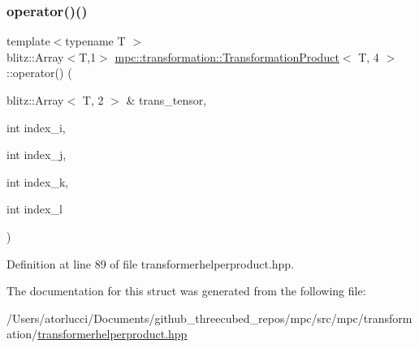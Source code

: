 \subsubsection{\texorpdfstring{operator()()}{operator()()}}
{\footnotesize\ttfamily template$<$typename T $>$ \\
blitz\+::\+Array$<$T,1$>$ \mbox{\hyperlink{structmpc_1_1transformation_1_1_transformation_product}{mpc\+::transformation\+::\+Transformation\+Product}}$<$ T, 4 $>$\+::operator() (\begin{DoxyParamCaption}\item[{blitz\+::\+Array$<$ T, 2 $>$ \&}]{trans\+\_\+tensor,  }\item[{int}]{index\+\_\+i,  }\item[{int}]{index\+\_\+j,  }\item[{int}]{index\+\_\+k,  }\item[{int}]{index\+\_\+l }\end{DoxyParamCaption})\hspace{0.3cm}{\ttfamily [inline]}}



Definition at line 89 of file transformerhelperproduct.\+hpp.



The documentation for this struct was generated from the following file\+:\begin{DoxyCompactItemize}
\item 
/\+Users/atorlucci/\+Documents/github\+\_\+threecubed\+\_\+repos/mpc/src/mpc/transformation/\mbox{\hyperlink{transformerhelperproduct_8hpp}{transformerhelperproduct.\+hpp}}\end{DoxyCompactItemize}
